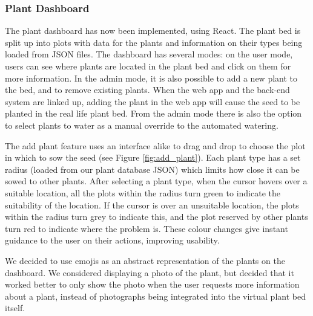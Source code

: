\documentclass{article}
\begin{document}
\subsubsection{Plant Dashboard}

The plant dashboard has now been implemented, using React. The plant bed is split up into plots with data for the plants and information on their types being loaded from JSON files. The dashboard has several modes: on the user mode, users can see where plants are located in the plant bed and click on them for more information. In the admin mode, it is also possible to add a new plant to the bed, and to remove existing plants. When the web app and the back-end system are linked up, adding the plant in the web app will cause the seed to be planted in the real life plant bed. From the admin mode there is also the option to select plants to water as a manual override to the automated watering.

The add plant feature uses an  interface alike to drag and drop to choose the plot in which to sow the seed (see Figure \ref{fig:add_plant}). Each plant type has a set radius (loaded from our plant database JSON) which limits how close it can be sowed to other plants. After selecting a plant type, when the cursor hovers over a suitable location, all the plots within the radius turn green to indicate the suitability of the location. If the cursor is over an unsuitable location, the plots within the radius turn grey to indicate this, and the plot reserved by other plants turn red to indicate where the problem is. These colour changes give instant guidance to the user on their actions, improving usability.

We decided to use emojis as an abstract representation of the plants on the dashboard. We considered displaying a photo of the plant, but decided that it worked better to only show the photo when the user requests more information about a plant, instead of photographs being integrated into the virtual plant bed itself.
\end{document}
